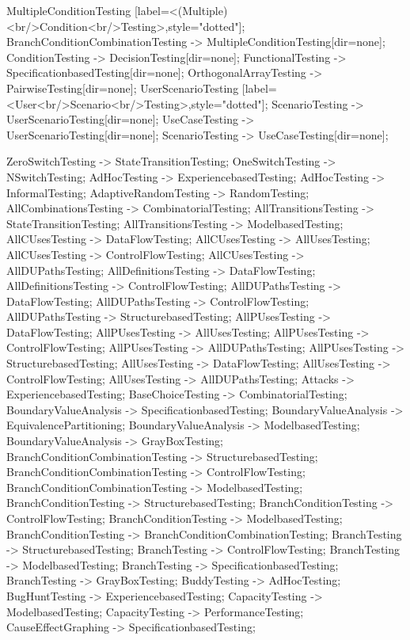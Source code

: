 \documentclass{article}
\begin{document}
{MultipleConditionTesting [label=<(Multiple)<br/>Condition<br/>Testing>,style="dotted"];
BranchConditionCombinationTesting -> MultipleConditionTesting[dir=none];
ConditionTesting -> DecisionTesting[dir=none];
FunctionalTesting -> SpecificationbasedTesting[dir=none];
OrthogonalArrayTesting -> PairwiseTesting[dir=none];
UserScenarioTesting [label=<User<br/>Scenario<br/>Testing>,style="dotted"];
ScenarioTesting -> UserScenarioTesting[dir=none];
UseCaseTesting -> UserScenarioTesting[dir=none];
ScenarioTesting -> UseCaseTesting[dir=none];

ZeroSwitchTesting -> StateTransitionTesting;
OneSwitchTesting -> NSwitchTesting;
AdHocTesting -> ExperiencebasedTesting;
AdHocTesting -> InformalTesting;
AdaptiveRandomTesting -> RandomTesting;
AllCombinationsTesting -> CombinatorialTesting;
AllTransitionsTesting -> StateTransitionTesting;
AllTransitionsTesting -> ModelbasedTesting;
AllCUsesTesting -> DataFlowTesting;
AllCUsesTesting -> AllUsesTesting;
AllCUsesTesting -> ControlFlowTesting;
AllCUsesTesting -> AllDUPathsTesting;
AllDefinitionsTesting -> DataFlowTesting;
AllDefinitionsTesting -> ControlFlowTesting;
AllDUPathsTesting -> DataFlowTesting;
AllDUPathsTesting -> ControlFlowTesting;
AllDUPathsTesting -> StructurebasedTesting;
AllPUsesTesting -> DataFlowTesting;
AllPUsesTesting -> AllUsesTesting;
AllPUsesTesting -> ControlFlowTesting;
AllPUsesTesting -> AllDUPathsTesting;
AllPUsesTesting -> StructurebasedTesting;
AllUsesTesting -> DataFlowTesting;
AllUsesTesting -> ControlFlowTesting;
AllUsesTesting -> AllDUPathsTesting;
Attacks -> ExperiencebasedTesting;
BaseChoiceTesting -> CombinatorialTesting;
BoundaryValueAnalysis -> SpecificationbasedTesting;
BoundaryValueAnalysis -> EquivalencePartitioning;
BoundaryValueAnalysis -> ModelbasedTesting;
BoundaryValueAnalysis -> GrayBoxTesting;
BranchConditionCombinationTesting -> StructurebasedTesting;
BranchConditionCombinationTesting -> ControlFlowTesting;
BranchConditionCombinationTesting -> ModelbasedTesting;
BranchConditionTesting -> StructurebasedTesting;
BranchConditionTesting -> ControlFlowTesting;
BranchConditionTesting -> ModelbasedTesting;
BranchConditionTesting -> BranchConditionCombinationTesting;
BranchTesting -> StructurebasedTesting;
BranchTesting -> ControlFlowTesting;
BranchTesting -> ModelbasedTesting;
BranchTesting -> SpecificationbasedTesting;
BranchTesting -> GrayBoxTesting;
BuddyTesting -> AdHocTesting;
BugHuntTesting -> ExperiencebasedTesting;
CapacityTesting -> ModelbasedTesting;
CapacityTesting -> PerformanceTesting;
CauseEffectGraphing -> SpecificationbasedTesting;
}
\end{document}
